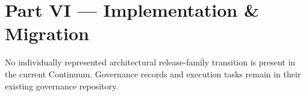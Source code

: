 \part*{Part VI — Implementation \& Migration}
\label{navigation:VI}
No individually represented architectural release-family transition is present in the current Continuum. Governance records and execution tasks remain in their existing governance repository.\par
